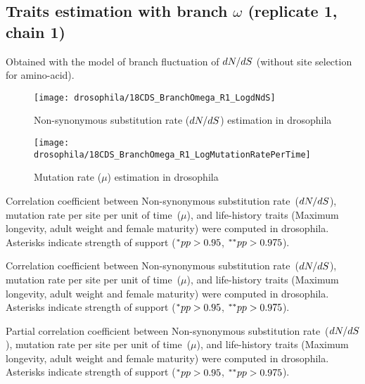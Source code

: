 \subsection{Traits estimation with branch \texorpdfstring{$\omega$}{ω} (replicate 1, chain 1)}
Obtained with the model of branch fluctuation of $\dnds$ (without site selection for amino-acid).

\begin{figure}[H]
    \centering
    \texttt{[image: drosophila/18CDS\_BranchOmega\_R1\_LogdNdS]}
    \caption[Non-synonymous \gls{substitution} rate estimation in drosophila]{Non-synonymous \gls{substitution} rate ($\dnds$) estimation in drosophila}
\end{figure}

\begin{figure}[H]
    \centering
    \texttt{[image: drosophila/18CDS\_BranchOmega\_R1\_LogMutationRatePerTime]}
    \caption[Mutation rate estimation in drosophila]{Mutation rate ($\mu$) estimation in drosophila}
\end{figure}


\begin{table}[H]
    
    \caption[Correlation coefficient matrix in drosophila ($\dnds$)]{
    Correlation coefficient between Non-synonymous \gls{substitution} rate~($\dnds$), mutation rate per site per unit of time~($\mu$), and life-history traits (Maximum longevity, adult weight and female maturity) were computed in drosophila.
    Asterisks indicate strength of support ($\smash{^{*}} pp > 0.95$, $\smash{^{**}} pp > 0.975$).}
\end{table}

\begin{table}[H]
    
    \caption[Covariance matrix in drosophila ($\dnds$)]{
    Correlation coefficient between Non-synonymous \gls{substitution} rate~($\dnds$), mutation rate per site per unit of time~($\mu$), and life-history traits (Maximum longevity, adult weight and female maturity) were computed in drosophila.
    Asterisks indicate strength of support ($\smash{^{*}} pp > 0.95$, $\smash{^{**}} pp > 0.975$).}
\end{table}

\begin{table}[H]
    
    \caption[Partial correlation coefficient matrix in drosophila ($\dnds$)]{
    Partial correlation coefficient between Non-synonymous \gls{substitution} rate~($\dnds$), mutation rate per site per unit of time~($\mu$), and life-history traits (Maximum longevity, adult weight and female maturity) were computed in drosophila.
    Asterisks indicate strength of support ($\smash{^{*}} pp > 0.95$, $\smash{^{**}} pp > 0.975$).}
\end{table}


